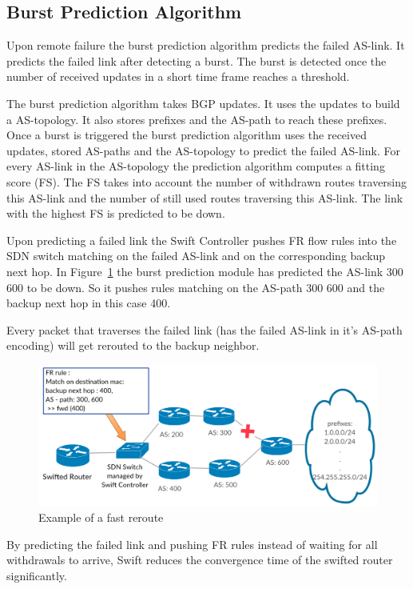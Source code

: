 \subsection{\label{chapter2:Swift:BPA}Burst Prediction Algorithm}
Upon remote failure the burst prediction algorithm predicts the failed AS-link. It predicts the failed link after detecting a burst. The burst is detected once the number of received updates in a short time frame reaches a threshold.

The burst prediction algorithm takes BGP updates. It uses the updates to build a AS-topology. It also stores prefixes and the AS-path to reach these prefixes. Once a burst is triggered the burst prediction algorithm uses the received updates, stored AS-paths and the AS-topology to predict the failed AS-link. For every AS-link in the AS-topology the prediction algorithm computes a fitting score (FS). The FS takes into account the number of withdrawn routes traversing this AS-link and the number of still used routes traversing this AS-link. The link with the highest FS is predicted to be down. 

Upon predicting a failed link the Swift Controller pushes FR flow rules into the SDN switch matching on the failed AS-link and on the corresponding backup next hop. In Figure~\ref{fig:swift_FR} the burst prediction module has predicted the AS-link 300 600 to be down. So it pushes rules matching on the AS-path 300 600 and the backup next hop in this case 400.

Every packet that traverses the failed link (has the failed AS-link in it's AS-path encoding) will get rerouted to the backup neighbor.
\begin{figure}[h]
\center
\includegraphics[scale = 0.32]{Figures/bckgrnd_swift_fr.pdf}
\caption{Example of a fast reroute}
\label{fig:swift_FR}
\end{figure}

By predicting the failed link and pushing FR rules instead of waiting for all withdrawals to arrive, Swift reduces the convergence time of the swifted router significantly.

